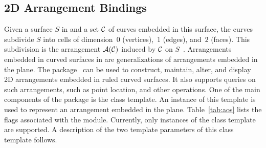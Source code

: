 \subsection{2D Arrangement Bindings}
\label{ssec:modules:aos2}
Given a surface $S$ in \Rthree{} and a set ${\cal C}$ of curves embedded
in this surface, the curves subdivide $S$ into cells of dimension~$0$
(vertices),~$1$ (edges), and~$2$ (faces). This subdivision is the
arrangement ${\cal A}({\cal C})$ induced by ${\cal C}$ on
$S$~\cite{fhw-caass-12}. Arrangements embedded in curved surfaces in
\Rthree{} are generalizations of arrangements embedded in the
plane. The \iiDArrangementsPackage{} package~\cite{cgal:wfzh-a2-21a}
can be used to construct, maintain, alter, and display 2D arrangements
embedded in ruled curved surfaces. It also supports queries on such
arrangements, such as point location, and other operations. One of the
main components of the \iiDArrangementsPackage{} package is the
 class template. An instance
of this template is used to represent an arrangement embedded in the
plane.  Table~\ref{tab:aos} lists the \cmake{} flags associated with
the \iiDArrangementsPackage{} module.  Currently, only instances of
the  class template are
supported. A description of the two template parameters of this class
template follows.

\begin{table}[!htp]
 \caption{\iiDArrangementsPackage{} module flags}
  \centering{}
 \label{tab:aos}
\end{table}

